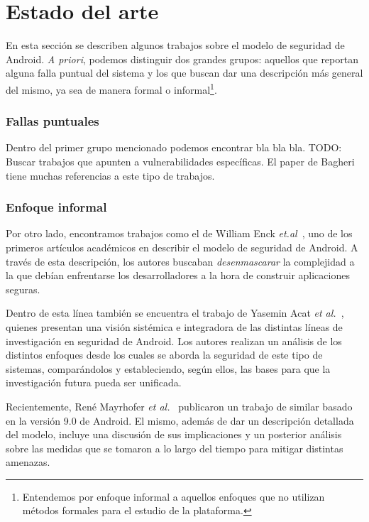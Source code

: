 
\chapter*{Estado del arte}
\label{chapter:estado}

En esta sección se describen algunos trabajos sobre el modelo de seguridad de
Android. \textit{A priori}, podemos distinguir dos grandes grupos: aquellos que
reportan alguna falla puntual del sistema y los que buscan dar una descripción
más general del mismo, ya sea de manera formal o informal\footnote{Entendemos
por enfoque informal a aquellos enfoques que no utilizan métodos formales para
el estudio de la plataforma.}.

\subsection*{Fallas puntuales}

Dentro del primer grupo mencionado podemos encontrar bla bla bla. TODO: Buscar
trabajos que apunten a vulnerabilidades específicas. El paper de Bagheri
\cite{bagheri} tiene muchas referencias a este tipo de trabajos.

\subsection*{Enfoque informal}

Por otro lado, encontramos trabajos como el de William Enck
\textit{et.al}~\cite{enck}, uno de los primeros artículos académicos en
describir el modelo de seguridad de Android. A través de esta descripción, los
autores buscaban \textit{desenmascarar} la complejidad a la que debían
enfrentarse
%
%
los desarrolladores a la hora de construir aplicaciones seguras.

Dentro de esta línea también se encuentra el trabajo de Yasemin Acat \textit{et
al.}~\cite{sok}, quienes presentan una visión sistémica e integradora de las
distintas líneas de investigación en seguridad de Android. Los autores realizan
un análisis de los distintos enfoques desde los cuales se aborda la seguridad de
este tipo de sistemas, comparándolos y estableciendo, según ellos, las bases para
que la investigación futura pueda ser unificada.

Recientemente, René Mayrhofer \textit{et al.}~\cite{mayrhofer} publicaron un
trabajo de similar basado en la versión 9.0 de Android. El mismo, además de dar
un descripción detallada del modelo, incluye una discusión de sus implicaciones
y un posterior análisis sobre las medidas que se tomaron a lo largo del tiempo
para mitigar distintas amenazas.

